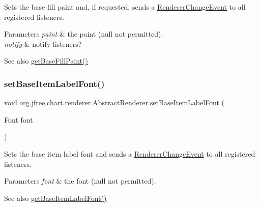 Sets the base fill paint and, if requested, sends a \mbox{\hyperlink{}{Renderer\+Change\+Event}} to all registered listeners.


\begin{DoxyParams}{Parameters}
{\em paint} & the paint ({\ttfamily null} not permitted). \\
\hline
{\em notify} & notify listeners?\\
\hline
\end{DoxyParams}
\begin{DoxySeeAlso}{See also}
\mbox{\hyperlink{classorg_1_1jfree_1_1chart_1_1renderer_1_1_abstract_renderer_a2a4e95f2a4c788c700bf5f14eff1ad01}{get\+Base\+Fill\+Paint()}} 
\end{DoxySeeAlso}
\mbox{\label{classorg_1_1jfree_1_1chart_1_1renderer_1_1_abstract_renderer_aced8e1ceab30b0c47a3397fc92a513e5}} 
\subsubsection{\texorpdfstring{set\+Base\+Item\+Label\+Font()}{setBaseItemLabelFont()}\hspace{0.1cm}{\footnotesize\ttfamily [1/2]}}
{\footnotesize\ttfamily void org.\+jfree.\+chart.\+renderer.\+Abstract\+Renderer.\+set\+Base\+Item\+Label\+Font (\begin{DoxyParamCaption}\item[{Font}]{font }\end{DoxyParamCaption})}

Sets the base item label font and sends a \mbox{\hyperlink{}{Renderer\+Change\+Event}} to all registered listeners.


\begin{DoxyParams}{Parameters}
{\em font} & the font ({\ttfamily null} not permitted).\\
\hline
\end{DoxyParams}
\begin{DoxySeeAlso}{See also}
\mbox{\hyperlink{classorg_1_1jfree_1_1chart_1_1renderer_1_1_abstract_renderer_aa6277326bc1ddd480515de060803b682}{get\+Base\+Item\+Label\+Font()}} 
\end{DoxySeeAlso}
\mbox{\label{classorg_1_1jfree_1_1chart_1_1renderer_1_1_abstract_renderer_a4d629460f56707639561cf4296721553}} 
